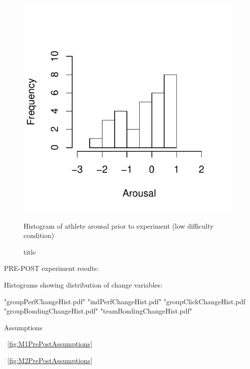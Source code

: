 \begin{figure}
  \centering
  \includegraphics[width=0.5\linewidth,keepaspectratio] {images/histArousalFactorPreLow-1}
      \caption{Histogram of athlete arousal prior to experiment (low difficulty condition)}
  \caption{title}
    \label{fig:histArousalFactorPreLow}
\end{figure}














PRE-POST experiment results:

Histograms showing distribution of change variables:

"groupPerfChangeHist.pdf"
"indPerfChangeHist.pdf"
"groupClickChangeHist.pdf
"groupBondingChangeHist.pdf"
"teamBondingChangeHist.pdf"



Assumptions

~\ref{fig:M1PrePostAssumptions}


~\ref{fig:M2PrePostAssumptions}
